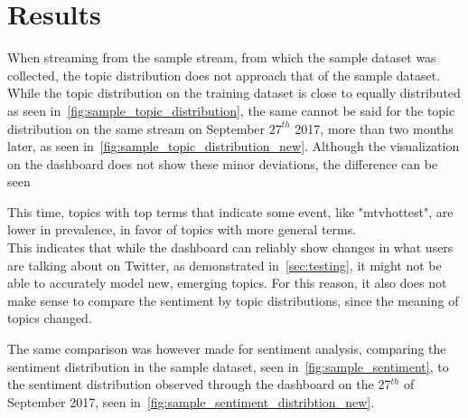 \chapter{Results}
\label{ch:results}

When streaming from the sample stream, from which the sample dataset was collected,
the topic distribution does not approach that of the sample dataset.
While the topic distribution on the training dataset is close to equally distributed as seen in~\cref{fig:sample_topic_distribution},
the same cannot be said for the topic distribution on the same stream on September $27^{th}$ 2017, more than two months later,
as seen in~\cref{fig:sample_topic_distribution_new}.
Although the visualization on the dashboard does not show these minor deviations,
the difference can be seen

This time, topics with top terms that indicate some event, like "mtvhottest", are lower in prevalence,
in favor of topics with more general terms.\\
This indicates that while the dashboard can reliably show changes in what users are talking about on Twitter,
as demonstrated in~\cref{sec:testing},
it might not be able to accurately model new, emerging topics.
For this reason, it also does not make sense to compare the sentiment by topic distributions,
since the meaning of topics changed.

The same comparison was however made for sentiment analysis, comparing the sentiment distribution in the sample dataset, seen in~\cref{fig:sample_sentiment},
to the sentiment distribution observed through the dashboard on the 27$^{th}$ of September 2017, seen in~\cref{fig:sample_sentiment_distribtion_new}.


